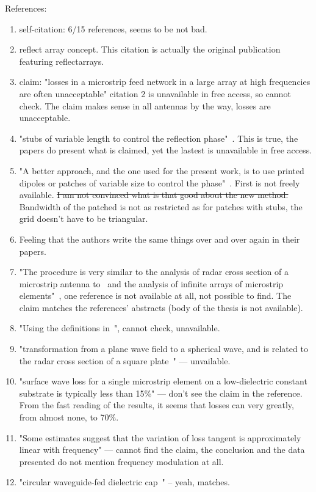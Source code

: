\documentclass{article}
\begin{document}
    References:
    \begin{enumerate}
        \item self-citation: 6/15 references, seems to be not bad.
        \item reflect array concept\cite{berry.etal_1963nov}.
        This citation is actually the original publication featuring reflectarrays.
        \item claim: "losses in a microstrip feed network in a large array at high frequencies are often unacceptable" citation 2 is unavailable in free access, so cannot check.
        The claim makes sense in all antennas by the way, losses are unacceptable.
        \item "stubs of variable length to control the reflection phase"~\cite{munson.etal_1987aug,huang_1991jun,chang.huang_1992}.
        This is true, the papers do present what is claimed, yet the lastest is unavailable in free access.
        \item "A better approach, and the one used for the present work, is to use printed dipoles or patches of variable size to control the phase"~\cite{pozar.metzler_1993apr,targonski.pozar_1994jun}.
        First is not freely available.
        \sout{I am not convinced what is that good about the new method.}
        Bandwidth of the patched is not as restricted as for patches with stubs, the grid doesn't have to be triangular.
        \item Feeling that the authors write the same things over and over again in their papers.
        \item "The procedure is very similar to the analysis of radar cross section of a microstrip antenna to~\cite{pozar_1987jun} and the analysis of infinite arrays of microstrip elements"~\cite{harackiewicz_1990jan}, one reference is not available at all, not possible to find.
        The claim matches the references' abstracts (body of the thesis is not available).
        \item "Using the definitions in~\cite{balanis_1982}",  cannot check, unavailable.
        \item "transformation from a plane wave field to a spherical wave, and is related to the radar cross section of a square plate~\cite{knott.etal_2004}" --- unvailable.
        \item "surface wave loss for a single microstrip element on a low-dielectric constant substrate is typically less than 15\%"\cite{pozar_1985oct} --- don't see the claim in the reference.
        From the fast reading of the results, it seems that losses can very greatly, from almost none, to 70\%.
        \item "Some estimates suggest that the variation of loss tangent is approximately linear with frequency\cite{levine.etal_1989apr}" --- cannot find the claim, the conclusion and the data presented do not mention frequency modulation at all.
        \item "circular waveguide-fed dielectric cap~\cite{syrigos_1987jun}" -- yeah, matches.
    \end{enumerate}
\end{document}
